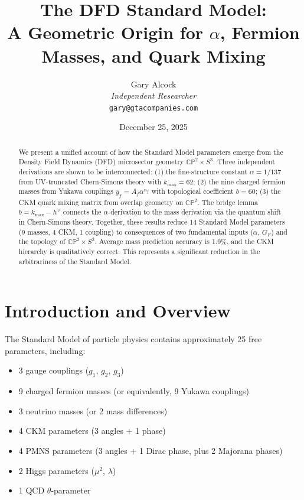 \documentclass[11pt,a4paper]{article}
\newcommand{\CP}{\mathbb{CP}}
\begin{document}
\title{The DFD Standard Model:\\
A Geometric Origin for $\alpha$, Fermion Masses, and Quark Mixing}

\author{Gary Alcock\\
\textit{Independent Researcher}\\
\texttt{gary@gtacompanies.com}}

\date{December 25, 2025}

\maketitle

\begin{abstract}
We present a unified account of how the Standard Model parameters emerge from the Density Field Dynamics (DFD) microsector geometry $\CP^2 \times S^3$. Three independent derivations are shown to be interconnected: (1) the fine-structure constant $\alpha = 1/137$ from UV-truncated Chern-Simons theory with $k_{\max} = 62$; (2) the nine charged fermion masses from Yukawa couplings $y_f = A_f \alpha^{n_f}$ with topological coefficient $b = 60$; (3) the CKM quark mixing matrix from overlap geometry on $\CP^2$. The bridge lemma $b = k_{\max} - h^\vee$ connects the $\alpha$-derivation to the mass derivation via the quantum shift in Chern-Simons theory. Together, these results reduce 14 Standard Model parameters (9 masses, 4 CKM, 1 coupling) to consequences of two fundamental inputs ($\alpha$, $G_F$) and the topology of $\CP^2 \times S^3$. Average mass prediction accuracy is 1.9\%, and the CKM hierarchy is qualitatively correct. This represents a significant reduction in the arbitrariness of the Standard Model.
\end{abstract}

\tableofcontents

\section{Introduction and Overview}

The Standard Model of particle physics contains approximately 25 free parameters, including:
\begin{itemize}
\item 3 gauge couplings ($g_1$, $g_2$, $g_3$)
\item 9 charged fermion masses (or equivalently, 9 Yukawa couplings)
\item 3 neutrino masses (or 2 mass differences)
\item 4 CKM parameters (3 angles + 1 phase)
\item 4 PMNS parameters (3 angles + 1 Dirac phase, plus 2 Majorana phases)
\item 2 Higgs parameters ($\mu^2$, $\lambda$)
\item 1 QCD $\theta$-parameter
\end{itemize}
\end{document}
